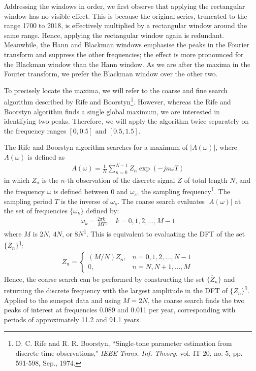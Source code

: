 \documentclass[a4paper, 11pt]{article}
\begin{document}
\newpage

Addressing the windows in order, we first observe that applying the rectangular
window has no visible effect. This is because the original series, truncated to
the range 1700 to 2018, is effectively multiplied by a rectangular window around
the same range. Hence, applying the rectangular window again is redundant.
Meanwhile, the Hann and Blackman windows emphasise the peaks in the Fourier
transform and suppress the other frequencies; the effect is more pronounced for
the Blackman window than the Hann window. As we are after the maxima in the
Fourier transform, we prefer the Blackman window over the other two.

To precisely locate the maxima, we will refer to the coarse and fine search
algorithm described by Rife and Boorstyn\footnote{D. C. Rife and R. R. Boorstyn,
``Single-tone parameter estimation from discrete-time observations,"
\textit{IEEE Trans. Inf. Theory}, vol. IT-20, no. 5, pp. 591-598, Sep., 1974.}.
However, whereas the Rife and Boorstyn algorithm finds a single global maximum,
we are interested in identifying two peaks. Therefore, we will apply the
algorithm twice separately on the frequency ranges $[0, 0.5]$ and $[0.5, 1.5]$.

The Rife and Boorstyn algorithm searches for a maximum of $|A(\omega)|$, where
$A(\omega)$ is defined as
\begin{align*}
    A(\omega) = \frac{1}{N} \sum_{n=0}^{N-1} Z_n \exp(-jn\omega T)
\end{align*}
in which $Z_n$ is the $n$-th observation of the discrete signal $Z$ of total
length $N$, and the frequency $\omega$ is defined between 0 and $\omega_s$, the
sampling frequency\textsuperscript{1}. The sampling period $T$ is the inverse of
$\omega_s$. The coarse search evaluates $|A(\omega)|$ at the set of frequencies
$\{\omega_k\}$ defined by:
\begin{align*}
    \omega_k = \frac{2\pi k}{MT}, \quad k = 0,1,2,\ldots,M-1
\end{align*}
where $M$ is $2N$, $4N$, or $8N$\textsuperscript{1}. This is equivalent to
evaluating the DFT of the set $\{\bar{Z}_n\}$\textsuperscript{1}:
\begin{align*}
    \bar{Z}_n = \begin{cases}
        (M/N)Z_n, & n = 0,1,2,\ldots,N-1 \\
        0,        & n = N,N+1,\ldots,M
    \end{cases}
\end{align*}
Hence, the coarse search can be performed by constructing the set
$\{\bar{Z}_n\}$ and returning the discrete frequency with the largest amplitude
in the DFT of $\{\bar{Z}_n\}$\textsuperscript{1}. Applied to the sunspot data
and using $M=2N$, the coarse search finds the two peaks of interest at
frequencies 0.089 and 0.011 per year, corresponding with periods of
approximately 11.2 and 91.1 years.
\end{document}
